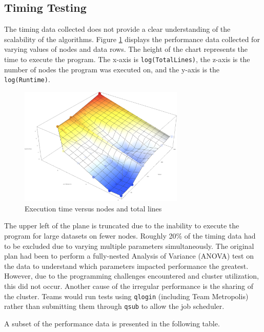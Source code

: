 

%
%

\subsection{Timing Testing}

The timing data collected does not provide a clear understanding of the scalability of the algorithms. Figure \ref{fig:plane} displays the performance data collected for varying values of nodes and data rows. The height of the chart represents the time to execute the program. The x-axis is \texttt{log(TotalLines)}, the z-axis is the number of nodes the program was executed on, and the y-axis is the \texttt{log(Runtime)}.


\begin{figure}[b!]
	\centering
	\includegraphics[width=0.7\textwidth]{./images/runtimes.png}
	\caption{Execution time versus nodes and total lines}
	\label{fig:plane}
\end{figure}


The upper left of the plane is truncated due to the inability to execute the program for large datasets on fewer nodes. Roughly 20\% of the timing data had to be excluded due to varying multiple parameters simultaneously. The original plan had been to perform a fully-nested Analysis of Variance (ANOVA) test on the data to understand which parameters impacted performance the greatest. However, due to the programming challenges encountered and cluster utilization, this did not occur. Another cause of the irregular performance is the sharing of the cluster. Teams would run tests using \texttt{qlogin} (including Team Metropolis) rather than submitting them through \texttt{qsub} to allow the job scheduler.

A subset of the performance data is presented in the following table. \\

